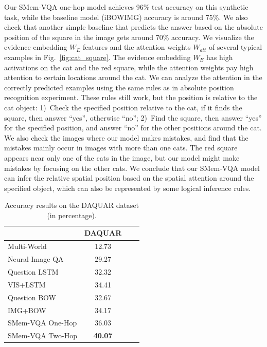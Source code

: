 Our SMem-VQA one-hop model achieves 96\% test accuracy on this synthetic task, while the baseline model (iBOWIMG) accuracy is around 75\%.
We also check that another simple baseline that predicts the answer based on the absolute position of the square in the image gets around 70\% accuracy. 
We visualize the evidence embedding $W_E$ features and the attention weights $W_{att}$ of several typical examples in Fig.~\ref{fig:cat_square}.
The evidence embedding $W_E$ has high activations on the cat and the red square, while the attention weights pay high attention to certain locations around the cat.
We can analyze the attention in the correctly predicted examples using the same rules as in absolute position recognition experiment. 
These rules still work, but the position is relative to the cat object:
1)~Check the specified position relative to the cat, if it finds the square, then answer ``yes'', otherwise ``no''; 2)~Find the square, then answer ``yes'' for the specified position, and answer ``no'' for the other positions around the cat.
We also check the images where our model makes mistakes, and find that the mistakes mainly occur in images with more than one cats. The red square appears near only one of the cats in the image, but our model might make mistakes by focusing on the other cats.
We conclude that our SMem-VQA model can infer the relative spatial position based on the spatial attention around the specified object, which can also be represented by some logical inference rules. 



\begin{table}[!t]
\centering
\caption{Accuracy results on the DAQUAR dataset (in percentage).}
\small
 \begin{tabular}{l || c c c} 
 \hline
 ~ & DAQUAR\\ \hline
 Multi-World~\cite{DBLP:journals/corr/MalinowskiF14} & 12.73 \\ %
 Neural-Image-QA~\cite{malinowski2015ask} & 29.27  \\ %
 Question LSTM~\cite{malinowski2015ask} & 32.32 \\ %
 VIS+LSTM~\cite{DBLP:journals/corr/RenKZ15} & 34.41 \\ %
 Question BOW~\cite{DBLP:journals/corr/RenKZ15} & 32.67 \\ %
 IMG+BOW~\cite{DBLP:journals/corr/RenKZ15} & 34.17 \\ \hline
 SMem-VQA One-Hop & 36.03 \\ %
 SMem-VQA Two-Hop & \bf{40.07} \\ \hline 
 \end{tabular}
\label{fig:baseline}
\vspace{-0.2in}
\end{table}


